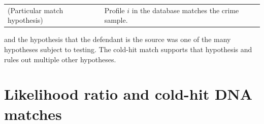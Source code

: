 \documentclass[10pt,dvipsnames,enabledeprecatedfontcommands]{scrartcl}
\begin{document}
\begin{tabular}{lp{8cm}}
(Particular match hypothesis) &
Profile $i$ in the database matches the crime sample.
\end{tabular}

\vspace{1mm} \noindent and the hypothesis that the defendant is the
source was one of the many hypotheses subject to testing. The cold-hit
match supports that hypothesis and rules out multiple other hypotheses.

\section{\texorpdfstring{Likelihood ratio and cold-hit DNA matches
\label{subsec:cold-hit}}{Likelihood ratio and cold-hit DNA matches }}\label{likelihood-ratio-and-cold-hit-dna-matches}
\end{document}
